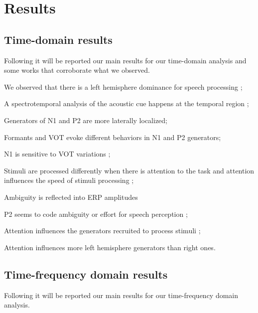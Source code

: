 \section*{Results}
\label{sec:resul}

\subsection*{Time-domain results}
Following it will be reported our main results for our time-domain analysis and
some works that corroborate what we observed.

\begin{itemize*}
\item We observed that there is a left hemisphere dominance for speech
 processing \citep{hickok2007cortical, boemio2005hierarchical}; \item A
 spectrotemporal analysis of the acoustic cue happens at the temporal region
 \citep{hickok2007cortical};
\item Generators of N1 and P2 are more laterally localized; \item Formants and
 VOT evoke different behaviors in N1 and P2 generators;
\item N1 is sensitive to VOT variations \citep{steinschneider1995physiologic,
 eggermont1995representation}; \item Stimuli are processed differently when
 there is attention to the task and attention influences the speed of
 stimuli processing
\citep{mottonen2014attention, alho2016early};
\item Ambiguity is reflected into ERP amplitudes \citep{bidelman2017} \item P2
 seems to code ambiguity or effort for speech perception
 \citep{rao2010selective};
\item Attention influences the generators recruited to process stimuli
 \citep{hillyard1973electrical}; \item Attention influences more left
 hemisphere generators than right ones.
\end{itemize*}

\subsection*{Time-frequency domain results}
Following it will be reported our main results for our time-frequency domain
analysis.

